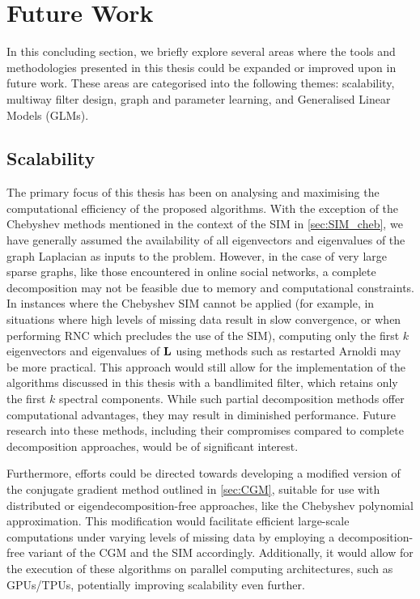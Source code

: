 \section{Future Work}

In this concluding section, we briefly explore several areas where the tools and methodologies presented in this thesis could be expanded or improved upon in future work. These areas are categorised into the following themes: scalability, multiway filter design, graph and parameter learning, and Generalised Linear Models (GLMs).

\subsection{Scalability}

The primary focus of this thesis has been on analysing and maximising the computational efficiency of the proposed algorithms. With the exception of the Chebyshev methods mentioned in the context of the SIM in \cref{sec:SIM_cheb}, we have generally assumed the availability of all eigenvectors and eigenvalues of the graph Laplacian as inputs to the problem. However, in the case of very large sparse graphs, like those encountered in online social networks, a complete decomposition may not be feasible due to memory and computational constraints. In instances where the Chebyshev SIM cannot be applied (for example, in situations where high levels of missing data result in slow convergence, or when performing RNC which precludes the use of the SIM), computing only the first $k$ eigenvectors and eigenvalues of $\mathbf{L}$ using methods such as restarted Arnoldi \citep{Lehoucq1998} may be more practical. This approach would still allow for the implementation of the algorithms discussed in this thesis with a bandlimited filter, which retains only the first $k$ spectral components. While such partial decomposition methods offer computational advantages, they may result in diminished performance. Future research into these methods, including their compromises compared to complete decomposition approaches, would be of significant interest.

Furthermore, efforts could be directed towards developing a modified version of the conjugate gradient method outlined in \cref{sec:CGM}, suitable for use with distributed or eigendecomposition-free approaches, like the Chebyshev polynomial approximation. This modification would facilitate efficient large-scale computations under varying levels of missing data by employing a decomposition-free variant of the CGM and the SIM accordingly. Additionally, it would allow for the execution of these algorithms on parallel computing architectures, such as GPUs/TPUs, potentially improving scalability even further.

